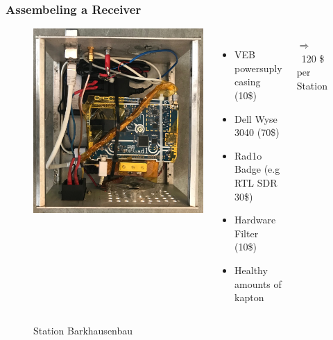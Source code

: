 \documentclass[aspectratio=169]{beamer}
\begin{document}

\begin{frame}
\frametitle{Assembeling a Receiver}

\begin{figure}
\begin{columns}
\begin{center}
\includegraphics[height=0.7\textheight]{figs/station_barkhausen.jpg}
\end{center}
\raggedright
\caption{Station Barkhausenbau}
\vspace{0.5cm}

\begin{itemize}
  \item VEB powersuply casing (10\$)
  \item Dell Wyse 3040 (70\$)
  \item Rad1o Badge (e.g RTL SDR 30\$)
  \item Hardware Filter (10\$)
  \item Healthy amounts of kapton
\end{itemize}

$\Rightarrow$ ~120 \$ per Station

\end{columns}
\end{figure}

\end{frame}
\end{document}
